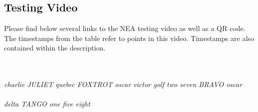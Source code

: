 \begin{flushleft}
    \subsection{Testing Video}
        Please find below several links to the NEA testing video as well as a QR code. The timestamps from the table refer to points in this video. Timestamps are also contained within the description. \\ \bk
        
        \begin{center}
            \quad
            \\ \BK
            \large
             \\            
            \smaller
            \textit{charlie JULIET quebec FOXTROT oscar victor golf two seven BRAVO oscar} \\ \bk  
            \large
             \\
            \smaller
            \textit{delta TANGO one five eight}
        \end{center}        
\end{flushleft}